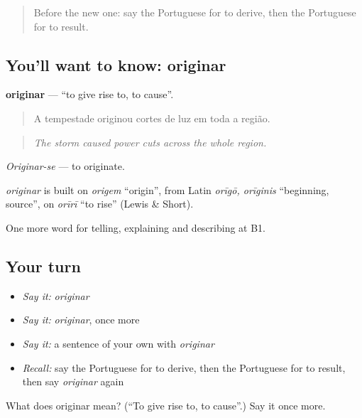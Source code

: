 \begin{quote}
Before the new one: say the Portuguese for to derive, then the Portuguese for to result.
\end{quote}

\subsection*{You'll want to know: originar}
\textbf{originar} — \textquotedblleft{}to give rise to, to cause\textquotedblright{}.

\begin{quote}
A tempestade originou cortes de luz em toda a região.
\end{quote}

\begin{quote}
\emph{The storm caused power cuts across the whole region.}
\end{quote}

\emph{Originar-se} — to originate.

\begin{cousinweb}
\emph{originar} is built on \emph{origem} \textquotedblleft{}origin\textquotedblright{}, from Latin \emph{orīgō, orīginis} \textquotedblleft{}beginning, source\textquotedblright{}, on \emph{orīrī} \textquotedblleft{}to rise\textquotedblright{} (Lewis \& Short).
\end{cousinweb}

\begin{grammarlens}[title={What you've built}]
One more word for telling, explaining and describing at B1.
\end{grammarlens}

\subsection*{Your turn}
\begin{itemize}
\raggedright
  \item \emph{Say it:} \emph{originar}
  \item \emph{Say it:} \emph{originar}, once more
  \item \emph{Say it:} a sentence of your own with \emph{originar}
  \item \emph{Recall:} say the Portuguese for to derive, then the Portuguese for to result, then say \emph{originar} again
\end{itemize}

\begin{tcolorbox}[breakable,colback=teal!4,colframe=teal!35!black,title={Before you move on}]
What does originar mean? (\textquotedblleft{}To give rise to, to cause\textquotedblright{}.) Say it once more.
\end{tcolorbox}
